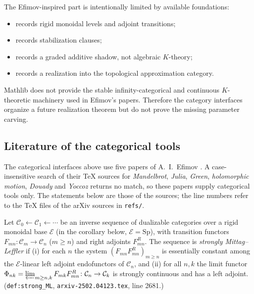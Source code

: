 The Efimov-inspired part is intentionally limited by available foundations:
\begin{itemize}
\item {} records rigid monoidal levels and
      adjoint transitions;
\item {} records stabilization clauses;
\item {} records a graded additive shadow, not
      algebraic $K$-theory;
\item {} records a realization into the
      topological approximation category.
\end{itemize}
Mathlib does not provide the stable infinity-categorical and continuous
$K$-theoretic machinery used in Efimov's papers.  Therefore the category
interfaces organize a future realization theorem but do not prove the
missing parameter carving.

\subsection{Literature of the categorical tools}
\label{sec:efimov-literature}

The categorical interfaces above use five papers of A.~I.~Efimov
\cite{EfimovContinuousK,EfimovInverseLimits,EfimovDevissage,EfimovRigidityMot,EfimovHeartKH}.
A case-insensitive search of their TeX sources for \emph{Mandelbrot}, \emph{Julia},
\emph{Green}, \emph{holomorphic motion}, \emph{Douady} and \emph{Yoccoz} returns no match,
so these papers supply categorical tools only.  The statements below are those of the
sources; the line numbers refer to the TeX files of the arXiv sources in \texttt{refs/}.

\begin{definition}
\label{def:strong-ml}
Let $\mathcal C_0\leftarrow\mathcal C_1\leftarrow\cdots$ be an inverse sequence of dualizable
categories over a rigid monoidal base $\mathcal E$ (in the corollary below, $\mathcal E=\mathrm{Sp}$),
with transition functors $F_{mn}\colon\mathcal C_m\to\mathcal C_n$ ($m\ge n$) and right adjoints
$F_{mn}^R$.  The sequence is \emph{strongly Mittag--Leffler} if
(i) for each $n$ the system $(F_{mn}F_{mn}^R)_{m\ge n}$ is essentially constant among the
$\mathcal E$-linear left adjoint endofunctors of $\mathcal C_n$, and
(ii) for all $n,k$ the limit functor $\Phi_{nk}=\varprojlim_{m\ge n,k}F_{mk}F_{mn}^R\colon\mathcal C_n\to\mathcal C_k$
is strongly continuous and has a left adjoint.
(\texttt{def:strong\_ML}, \texttt{arxiv-2502.04123.tex}, line 2681.)
\end{definition}

